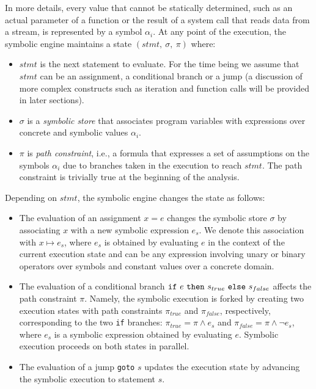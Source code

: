 In more details, every value that cannot be statically determined, such as an actual parameter of a function or the result of a system call that reads data from a stream, is represented by a symbol $\alpha_i$.  At any point of the execution, the symbolic engine maintains a state $(stmt,~\sigma,~\pi)$ where:

\begin{itemize}

\item $stmt$ is the next statement to evaluate. For the time being we assume that $stmt$ can be an assignment, a conditional branch or a jump (a discussion of more complex constructs such as iteration and function calls will be provided in later sections).

\item $\sigma$ is a {\em symbolic store} that associates program variables with expressions over concrete and symbolic values $\alpha_i$.

  \item $\pi$ is {\em path constraint}, i.e., a formula that expresses a set of assumptions on the symbols $\alpha_i$ due to branches taken in the execution to reach $stmt$. The path constraint is trivially true at the beginning of the analysis.

\end{itemize}

\noindent Depending on $stmt$, the symbolic engine changes the state as follows:
\begin{itemize}
  \item The evaluation of an assignment $x=e$ changes the symbolic store $\sigma$ by associating $x$ with a new symbolic expression $e_s$. We denote this association with $x\mapsto e_s$, where $e_s$ is obtained by evaluating $e$ in the context of the current execution state and  can be any expression involving unary or binary operators over symbols and constant values over a concrete domain.
  

  \item The evaluation of a conditional branch ${\tt if}~e~{\tt then}~s_{true}~{\tt else}~s_{false}$ affects the path constraint $\pi$. Namely, the symbolic execution is forked by creating two execution states with path constraints $\pi_{true}$ and $\pi_{false}$, respectively, corresponding to the two {\tt if} branches: $\pi_{true}=\pi \wedge e_s$ and $\pi_{false}=\pi \wedge \neg e_s$, where $e_s$ is a symbolic expression obtained by evaluating $e$. 
    Symbolic execution proceeds on both states in parallel.

  \item The evaluation of a jump {\tt goto} $s$ updates the execution state by advancing the symbolic execution to statement $s$. 
\end{itemize}

